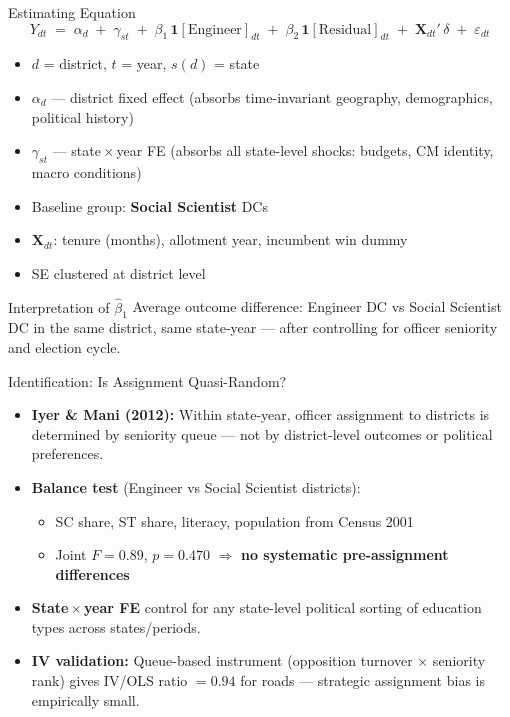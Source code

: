 \documentclass[aspectratio=169,10pt]{beamer}
\begin{document}
\begin{frame}{Estimating Equation}
  \[
    Y_{dt} \;=\; \alpha_d \;+\; \gamma_{st} \;+\;
    \beta_1\,\mathbf{1}[\text{Engineer}]_{dt} \;+\;
    \beta_2\,\mathbf{1}[\text{Residual}]_{dt} \;+\;
    \mathbf{X}_{dt}'\,\delta \;+\; \varepsilon_{dt}
  \]
  \vspace{4pt}
  \begin{itemize}\setlength\itemsep{5pt}
    \item $d$ = district, $t$ = year, $s(d)$ = state
    \item $\alpha_d$ — district fixed effect (absorbs time-invariant geography,
          demographics, political history)
    \item $\gamma_{st}$ — state\,$\times$\,year FE (absorbs all state-level
          shocks: budgets, CM identity, macro conditions)
    \item Baseline group: \textbf{Social Scientist} DCs
    \item $\mathbf{X}_{dt}$: tenure (months), allotment year, incumbent win dummy
    \item SE clustered at district level
  \end{itemize}
  \vspace{6pt}
  \begin{block}{Interpretation of $\hat\beta_1$}
    Average outcome difference: Engineer DC vs Social Scientist DC
    in the same district, same state-year — after controlling for
    officer seniority and election cycle.
  \end{block}
\end{frame}

\begin{frame}{Identification: Is Assignment Quasi-Random?}
  \begin{itemize}\setlength\itemsep{8pt}
    \item \textbf{Iyer \& Mani (2012):} Within state-year, officer
          assignment to districts is determined by seniority queue —
          not by district-level outcomes or political preferences.
    \item \textbf{Balance test} (Engineer vs Social Scientist districts):
          \begin{itemize}
            \item SC share, ST share, literacy, population from Census 2001
            \item Joint $F = 0.89$, $p = 0.470$ $\Rightarrow$
                  \textbf{no systematic pre-assignment differences}
          \end{itemize}
    \item \textbf{State\,$\times$\,year FE} control for any state-level
          political sorting of education types across states/periods.
    \item \textbf{IV validation:} Queue-based instrument
          (opposition turnover $\times$ seniority rank) gives
          IV/OLS ratio $= 0.94$ for roads — strategic assignment
          bias is empirically small.
  \end{itemize}
\end{frame}
\end{document}
